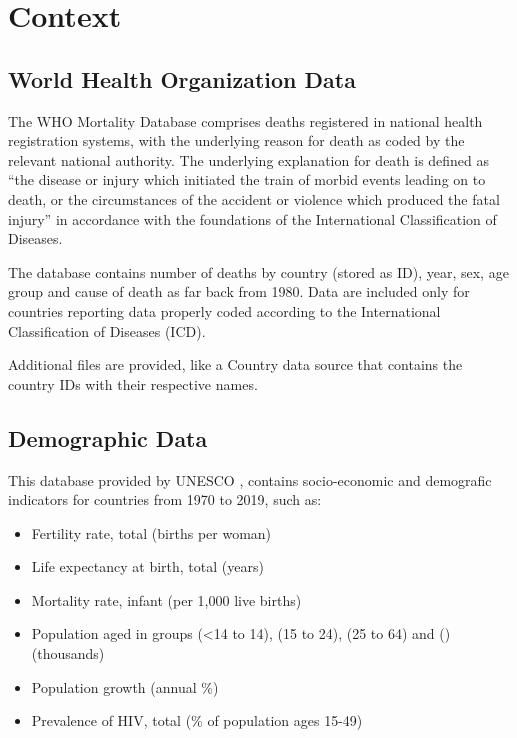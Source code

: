 

\section{Context}

\subsection{World Health Organization Data}

The WHO Mortality Database \cite{who} comprises deaths registered in national health registration systems, with the underlying reason for death as coded by the relevant national authority. The underlying explanation for death is defined as “the disease or injury which initiated the train of morbid events leading on to death, or the circumstances of the accident or violence which produced the fatal injury” in accordance with the foundations of the International Classification of Diseases.

The database contains number of deaths by country (stored as ID), year, sex, age group and cause of death as far back from 1980. Data are included only for countries reporting data properly coded according to the International Classification of Diseases (ICD).

Additional files are provided, like a Country data source that contains the country IDs with their respective names.


\subsection{Demographic Data}

This database provided by UNESCO \cite{unesco}, contains socio-economic and demografic indicators for countries from 1970 to 2019, such as:

\begin{itemize}
    \item Fertility rate, total (births per woman)
    \item Life expectancy at birth, total (years)
    \item Mortality rate, infant (per 1,000 live births)
    \item Population aged in groups (<14 to 14), (15 to 24), (25 to 64) and () (thousands)
    \item Population growth (annual \%)
    \item Prevalence of HIV, total (\% of population ages 15-49)
\end{itemize}

